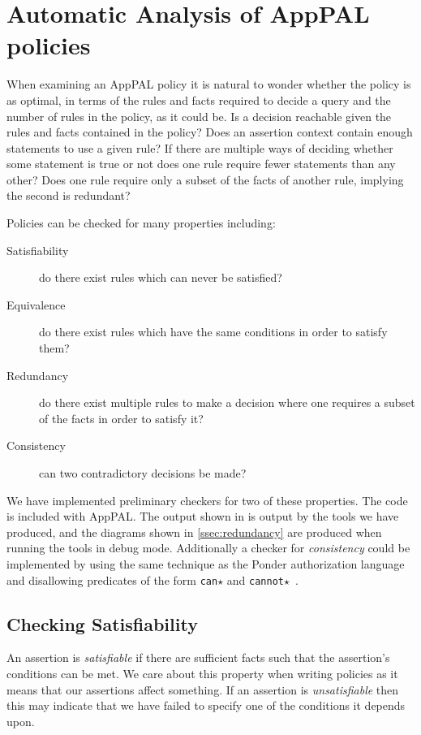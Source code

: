 \documentclass[thesis.tex]{subfiles}
\begin{document}
\section{Automatic Analysis of AppPAL policies}
\label{sec:lint}

When examining an AppPAL policy it is natural to wonder whether the
policy is as optimal, in terms of the rules and facts required to
decide a query and the number of rules in the policy, as it could
be. Is a decision reachable given the rules and facts contained in the
policy?  Does an assertion context contain enough statements to use a
given rule? If there are multiple ways of deciding whether some
statement is true or not does one rule require fewer statements than
any other? Does one rule require only a subset of the facts of another
rule, implying the second is redundant?

Policies can be checked for many properties including:
\begin{description}
\item[Satisfiability] do there exist rules which can never be satisfied?
\item[Equivalence] do there exist rules which have the same conditions in order to satisfy them?
\item[Redundancy] do there exist multiple rules to make a decision where one requires a subset of the facts in order to satisfy it?
\item[Consistency] can two contradictory decisions be made?
\end{description}

We have implemented preliminary checkers for two of these properties. The code
is included with AppPAL. The output shown in  is
output by the tools we have produced, and the diagrams shown in
\autoref{ssec:redundancy} are produced when running the tools in debug mode.
Additionally a checker for \emph{consistency} could be implemented by using the
same technique as the Ponder authorization language and disallowing predicates
of the form \texttt{can$\star$} and
\texttt{cannot$\star$}~\cite{damianou_ponder_2001}.


\subsection{Checking Satisfiability}

An assertion is \emph{satisfiable} if there are sufficient facts
such that the assertion's conditions can be met.  We care about this
property when writing policies as it means that our assertions affect
something.  If an assertion is \emph{unsatisfiable} then this may
indicate that we have failed to specify one of the conditions it
depends upon.
\end{document}
